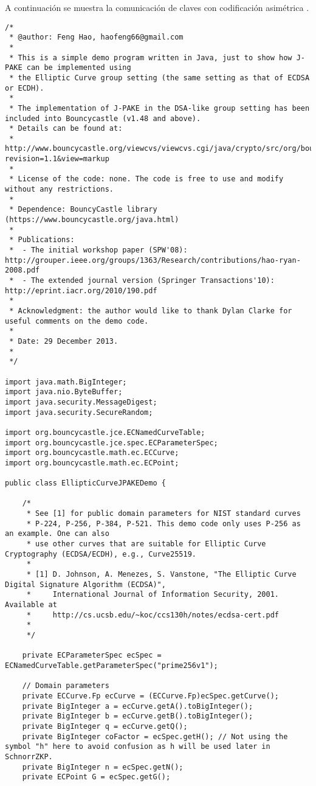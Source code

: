 \documentclass[../PFC.tex]{subfiles}
\begin{document}
A continuación se muestra la comunicación de claves con codificación asimétrica \cite{fengHaoCode}.
\begin{lstlisting}
/*  
 * @author: Feng Hao, haofeng66@gmail.com
 * 
 * This is a simple demo program written in Java, just to show how J-PAKE can be implemented using
 * the Elliptic Curve group setting (the same setting as that of ECDSA or ECDH). 
 * 
 * The implementation of J-PAKE in the DSA-like group setting has been included into Bouncycastle (v1.48 and above). 
 * Details can be found at:
 * http://www.bouncycastle.org/viewcvs/viewcvs.cgi/java/crypto/src/org/bouncycastle/crypto/examples/JPAKEExample.java?revision=1.1&view=markup
 * 
 * License of the code: none. The code is free to use and modify without any restrictions.
 *
 * Dependence: BouncyCastle library (https://www.bouncycastle.org/java.html) 
 *  
 * Publications:    
 *  - The initial workshop paper (SPW'08): http://grouper.ieee.org/groups/1363/Research/contributions/hao-ryan-2008.pdf
 *  - The extended journal version (Springer Transactions'10): http://eprint.iacr.org/2010/190.pdf
 * 
 * Acknowledgment: the author would like to thank Dylan Clarke for useful comments on the demo code. 
 * 
 * Date: 29 December 2013.
 *  
 */

import java.math.BigInteger;
import java.nio.ByteBuffer;
import java.security.MessageDigest;
import java.security.SecureRandom;

import org.bouncycastle.jce.ECNamedCurveTable;
import org.bouncycastle.jce.spec.ECParameterSpec;
import org.bouncycastle.math.ec.ECCurve;
import org.bouncycastle.math.ec.ECPoint;

public class EllipticCurveJPAKEDemo {

	/*
	 * See [1] for public domain parameters for NIST standard curves
	 * P-224, P-256, P-384, P-521. This demo code only uses P-256 as an example. One can also
	 * use other curves that are suitable for Elliptic Curve Cryptography (ECDSA/ECDH), e.g., Curve25519.
	 *  
	 * [1] D. Johnson, A. Menezes, S. Vanstone, "The Elliptic Curve Digital Signature Algorithm (ECDSA)",
	 *     International Journal of Information Security, 2001. Available at
	 *     http://cs.ucsb.edu/~koc/ccs130h/notes/ecdsa-cert.pdf 
	 *  
	 */
	
	private ECParameterSpec ecSpec = ECNamedCurveTable.getParameterSpec("prime256v1");
	
	// Domain parameters 
	private ECCurve.Fp ecCurve = (ECCurve.Fp)ecSpec.getCurve();	
	private BigInteger a = ecCurve.getA().toBigInteger();
	private BigInteger b = ecCurve.getB().toBigInteger();
	private BigInteger q = ecCurve.getQ();
	private BigInteger coFactor = ecSpec.getH(); // Not using the symbol "h" here to avoid confusion as h will be used later in SchnorrZKP. 
	private BigInteger n = ecSpec.getN();
	private ECPoint G = ecSpec.getG();
	

\end{lstlisting}
\end{document}

